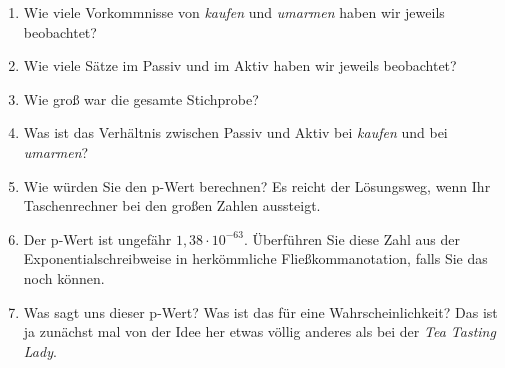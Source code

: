 \begin{enumerate}\Lf
  \item Wie viele Vorkommnisse von \textit{kaufen} und \textit{umarmen} haben wir jeweils beobachtet? 
  \item Wie viele Sätze im Passiv und im Aktiv haben wir jeweils beobachtet? 
  \item Wie groß war die gesamte Stichprobe? 
  \item Was ist das Verhältnis zwischen Passiv und Aktiv bei \textit{kaufen} und bei \textit{umarmen}? 
  \item Wie würden Sie den p-Wert berechnen? Es reicht der Lösungsweg, wenn Ihr Taschenrechner bei den großen Zahlen aussteigt.
  \item Der p-Wert ist ungefähr $1,38\cdot 10^{-63}$. Überführen Sie diese Zahl aus der Exponentialschreibweise in herkömmliche Fließkommanotation, falls Sie das noch können.
  \item Was sagt uns dieser p-Wert? Was ist das für eine Wahrscheinlichkeit? Das ist ja zunächst mal von der Idee her etwas völlig anderes als bei der \textit{Tea Tasting Lady}.

\end{enumerate}
